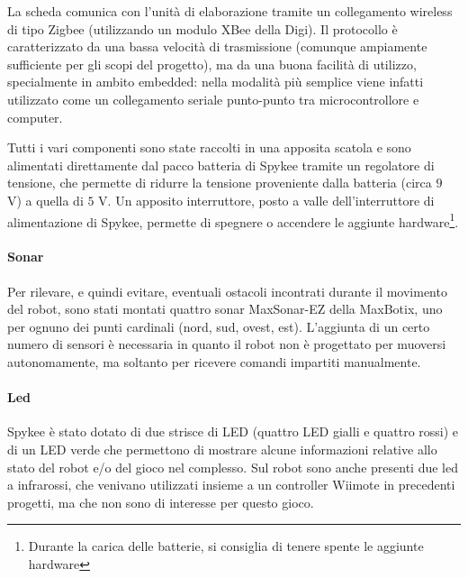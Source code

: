 La scheda comunica con l'unità di elaborazione tramite un collegamento wireless di tipo Zigbee (utilizzando un modulo XBee della Digi). Il protocollo è caratterizzato da una bassa velocità di trasmissione (comunque ampiamente sufficiente per gli scopi del progetto), ma da una buona facilità di utilizzo, specialmente in ambito embedded: nella modalità più semplice viene infatti utilizzato come un collegamento seriale punto-punto tra microcontrollore e computer.

Tutti i vari componenti sono state raccolti in una apposita scatola e sono alimentati direttamente dal pacco batteria di Spykee tramite un regolatore di tensione, che permette di ridurre la tensione proveniente dalla batteria (circa $9$ V) a quella di $5$ V. Un apposito interruttore, posto a valle dell'interruttore di alimentazione di Spykee, permette di spegnere o accendere le aggiunte hardware\footnote{Durante la carica delle batterie, si consiglia di tenere spente le aggiunte hardware}.

\paragraph{Sonar} Per rilevare, e quindi evitare, eventuali ostacoli incontrati durante il movimento del robot, sono stati montati quattro sonar MaxSonar\textregistered-EZ della MaxBotix, uno per ognuno dei punti cardinali (nord, sud, ovest, est). L'aggiunta di un certo numero di sensori è necessaria in quanto il robot non è progettato per muoversi autonomamente, ma soltanto per ricevere comandi impartiti manualmente. 

\paragraph{Led} Spykee è stato dotato di due strisce di LED (quattro LED gialli e quattro rossi) e di un LED verde che permettono di mostrare alcune informazioni relative allo stato del robot e/o del gioco nel complesso. Sul robot sono anche presenti due led a infrarossi, che venivano utilizzati insieme a un controller Wiimote in precedenti progetti, ma che non sono di interesse per questo gioco. 

